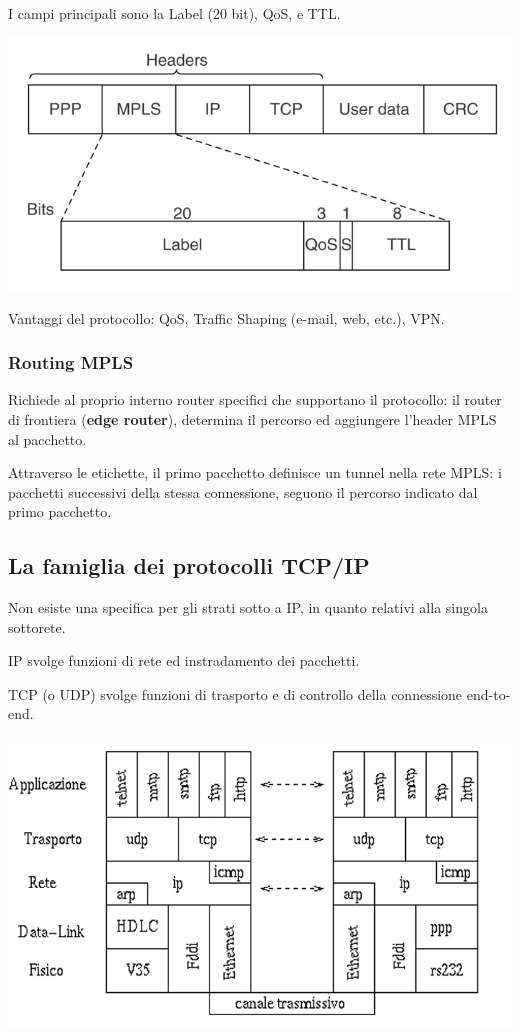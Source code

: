         I campi principali sono la Label (20 bit), QoS, e TTL.

        \begin{center}
            \includegraphics[scale=0.4]{chapters/4/assets/schema_a.png}
        \end{center}
        
        Vantaggi del protocollo: QoS, Traffic Shaping (e-mail, web, etc.), VPN.

        \subsubsection{Routing MPLS}
            Richiede al proprio interno router specifici che supportano il protocollo: il router di frontiera (\textbf{edge router}), determina il percorso ed aggiungere l'header MPLS al pacchetto.
    
            Attraverso le etichette, il primo pacchetto definisce un tunnel nella rete MPLS: i pacchetti successivi della stessa connessione, seguono il percorso indicato dal primo pacchetto.

    \subsection{La famiglia dei protocolli TCP/IP}
        Non esiste una specifica per gli strati sotto a IP, in quanto relativi alla singola sottorete.
        
        IP svolge funzioni di rete ed instradamento dei pacchetti.
    
        TCP (o UDP) svolge funzioni di trasporto e di controllo della connessione end-to-end.
    
        \begin{center}
            \includegraphics[scale=0.45]{chapters/4/assets/schema_b.png}
        \end{center}

